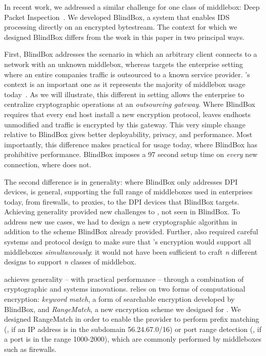 In recent work, we addressed a similar challenge for one class of middlebox: Deep Packet Inspection~\cite{blindbox}.  
We developed BlindBox, a system that enables IDS processing directly on an encrypted bytestream. 
The context for which we designed BlindBox differs from the work in this paper in two principal ways.

First, BlindBox addresses the scenario in which an arbitrary client connects to a network with an unknown middlebox, whereas \sys targets the enterprise setting where an entire companies traffic is outsourced to a known service provider.
\sys's context is an important one as it represents the majority of middlebox usage today~\cite{need-citation}. 
As we will illustrate, this different in setting allows the enterprise to centralize cryptographic operations at an {\it outsourcing gateway}.
Where BlindBox requires that every end host install a new encryption protocol, \sys leaves endhosts unmodified and traffic is encrypted by this gateway.
This very simple change relative to BlindBox gives \sys better deployability, privacy, and performance.
Most importantly, this difference makes \sys practical for usage today, where BlindBox has prohibitive performance.
BlindBox imposes a 97 second setup time on {\it every} new connection, where \sys does not.

The second difference is in generality: where BlindBox only addresses DPI devices, \sys is general, supporting the full range of middleboxes used in enterprises today, from firewalls, to proxies, to the DPI devices that BlindBox targets.
Achieving generality provided new challenges to \sys, not seen in BlindBox. 
To address new use cases, we had to design a new cryptographic algorithm in addition to the scheme BlindBox already provided. 
Further, \sys also required careful systems and protocol design to make sure that \sys's encryption would support all middleboxes {\it simultaneously}: it would not have been sufficient to craft {\it n} different designs to support {\it n} classes of middlebox.


    \sys achieves generality -- with practical performance -- through a combination of cryptographic and systems innovations.
    \sys relies on two forms of computational encryption: {\it keyword match}, a form of searchable encryption developed by BlindBox,  and {\it RangeMatch}, a new encryption scheme we designed for \sys.
    We designed RangeMatch in order to enable the provider to perform prefix matching (\eg{}, if an IP address is in the subdomain 56.24.67.0/16) or port range detection (\eg{}, if a port is in the range 1000-2000), which are commonly performed by middleboxes such as firewalls. 

